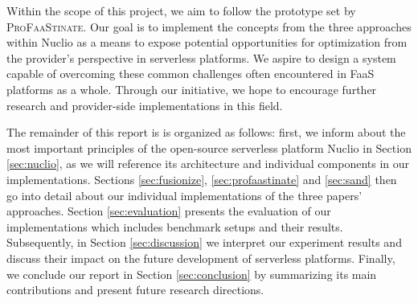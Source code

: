 
Within the scope of this project, we aim to follow the prototype set by
\textsc{ProFaaStinate}. Our goal is to implement the concepts from the three
approaches within Nuclio as a means to expose potential opportunities for
optimization from the provider's perspective in serverless platforms. We aspire
to design a system capable of overcoming these common challenges often
encountered in FaaS platforms as a whole. Through our initiative, we hope to
encourage further research and provider-side implementations in this field.

The remainder of this report is is organized as follows: first, we inform about
the most important principles of the open-source serverless platform Nuclio in
Section \ref{sec:nuclio}, as we will reference its architecture and individual
components in our implementations. Sections \ref{sec:fusionize},
\ref{sec:profaastinate} and \ref{sec:sand} then go into detail about our
individual implementations of the three papers' approaches. Section
\ref{sec:evaluation} presents the evaluation of our implementations which
includes benchmark setups and their results. Subsequently, in Section
\ref{sec:discussion} we interpret our experiment results and discuss their
impact on the future development of serverless platforms. Finally, we conclude
our report in Section \ref{sec:conclusion} by summarizing its main contributions
and present future research directions.

